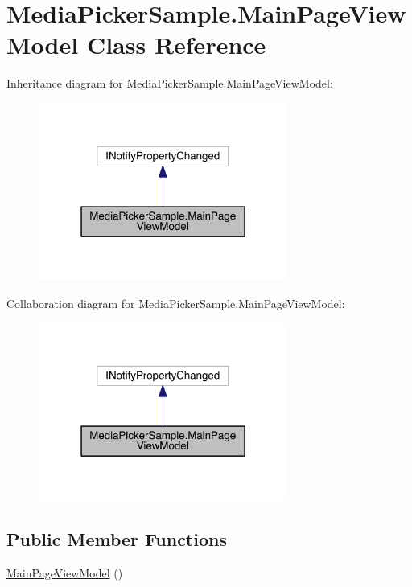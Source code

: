 \hypertarget{class_media_picker_sample_1_1_main_page_view_model}{\section{Media\+Picker\+Sample.\+Main\+Page\+View\+Model Class Reference}
\label{class_media_picker_sample_1_1_main_page_view_model}
}


Inheritance diagram for Media\+Picker\+Sample.\+Main\+Page\+View\+Model\+:
\nopagebreak
\begin{figure}[H]
\begin{center}
\leavevmode
\includegraphics[width=232pt]{class_media_picker_sample_1_1_main_page_view_model__inherit__graph}
\end{center}
\end{figure}


Collaboration diagram for Media\+Picker\+Sample.\+Main\+Page\+View\+Model\+:
\nopagebreak
\begin{figure}[H]
\begin{center}
\leavevmode
\includegraphics[width=232pt]{class_media_picker_sample_1_1_main_page_view_model__coll__graph}
\end{center}
\end{figure}
\subsection*{Public Member Functions}
\begin{DoxyCompactItemize}
\item 
\hyperlink{class_media_picker_sample_1_1_main_page_view_model_aa51252662f474d6ac18c403aaa98a67f}{Main\+Page\+View\+Model} ()
\end{DoxyCompactItemize}
